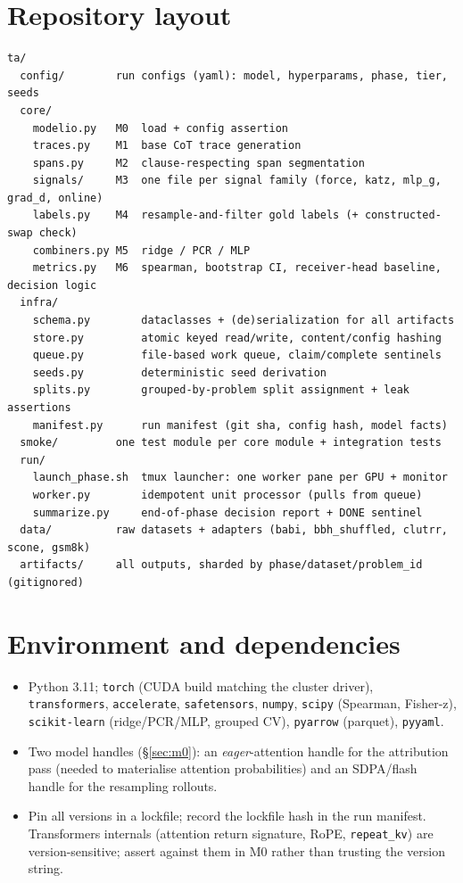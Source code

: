 \documentclass[11pt]{article}
\begin{document}
\section{Repository layout}
\begin{lstlisting}
ta/
  config/        run configs (yaml): model, hyperparams, phase, tier, seeds
  core/
    modelio.py   M0  load + config assertion
    traces.py    M1  base CoT trace generation
    spans.py     M2  clause-respecting span segmentation
    signals/     M3  one file per signal family (force, katz, mlp_g, grad_d, online)
    labels.py    M4  resample-and-filter gold labels (+ constructed-swap check)
    combiners.py M5  ridge / PCR / MLP
    metrics.py   M6  spearman, bootstrap CI, receiver-head baseline, decision logic
  infra/
    schema.py        dataclasses + (de)serialization for all artifacts
    store.py         atomic keyed read/write, content/config hashing
    queue.py         file-based work queue, claim/complete sentinels
    seeds.py         deterministic seed derivation
    splits.py        grouped-by-problem split assignment + leak assertions
    manifest.py      run manifest (git sha, config hash, model facts)
  smoke/         one test module per core module + integration tests
  run/
    launch_phase.sh  tmux launcher: one worker pane per GPU + monitor
    worker.py        idempotent unit processor (pulls from queue)
    summarize.py     end-of-phase decision report + DONE sentinel
  data/          raw datasets + adapters (babi, bbh_shuffled, clutrr, scone, gsm8k)
  artifacts/     all outputs, sharded by phase/dataset/problem_id (gitignored)
\end{lstlisting}

\section{Environment and dependencies}
\begin{itemize}
\item Python 3.11; \texttt{torch} (CUDA build matching the cluster driver), \texttt{transformers},
\texttt{accelerate}, \texttt{safetensors}, \texttt{numpy}, \texttt{scipy} (Spearman, Fisher-z),
\texttt{scikit-learn} (ridge/PCR/MLP, grouped CV), \texttt{pyarrow} (parquet), \texttt{pyyaml}.
\item Two model handles (\S\ref{sec:m0}): an \emph{eager}-attention handle for the attribution pass
(needed to materialise attention probabilities) and an SDPA/flash handle for the resampling rollouts.
\item Pin all versions in a lockfile; record the lockfile hash in the run manifest. Transformers
internals (attention return signature, RoPE, \texttt{repeat\_kv}) are version-sensitive; assert against
them in M0 rather than trusting the version string.
\end{itemize}
\end{document}
